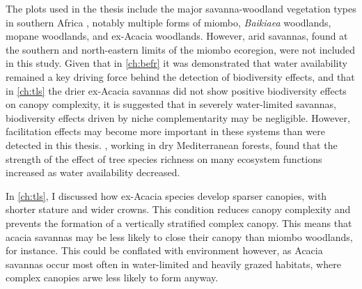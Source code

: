 \begin{refsection}
The plots used in the thesis include the major savanna-woodland vegetation types in southern Africa \citep{}, notably multiple forms of miombo, \textit{Baikiaea} woodlands, mopane woodlands, and ex-Acacia woodlands. However, arid savannas, found at the southern and north-eastern limits of the miombo ecoregion, were not included in this study. Given that in \autoref{ch:befr} it was demonstrated that water availability remained a key driving force behind the detection of biodiversity effects, and that in \autoref{ch:tls} the drier ex-Acacia savannas did not show positive biodiversity effects on canopy complexity, it is suggested that in severely water-limited savannas, biodiversity effects driven by niche complementarity may be negligible. However, facilitation effects may become more important in these systems than were detected in this thesis. \citet{Ratcliffe2017}, working in dry Mediterranean forests, found that the strength of the effect of tree species richness on many ecosystem functions increased as water availability decreased. 

In \autoref{ch:tls}, I discussed how ex-Acacia species develop sparser canopies, with shorter stature and wider crowns. This condition reduces canopy complexity and prevents the formation of a vertically stratified complex canopy. This means that acacia savannas may be less likely to close their canopy than miombo woodlands, for instance. This could be conflated with environment however, as Acacia savannas occur most often in water-limited and heavily grazed habitats, where complex canopies arwe less likely to form anyway.




\end{refsection}
